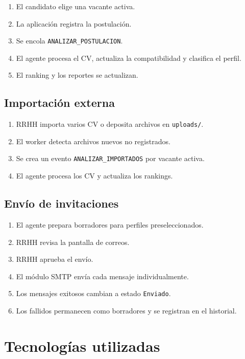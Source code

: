 \documentclass[12pt,a4paper]{article}
\begin{document}
\begin{enumerate}[leftmargin=*]
    \item El candidato elige una vacante activa.
    \item La aplicación registra la postulación.
    \item Se encola \texttt{ANALIZAR\_POSTULACION}.
    \item El agente procesa el CV, actualiza la compatibilidad y clasifica el perfil.
    \item El ranking y los reportes se actualizan.
\end{enumerate}

\subsection{Importación externa}

\begin{enumerate}[leftmargin=*]
    \item RRHH importa varios CV o deposita archivos en \texttt{uploads/}.
    \item El worker detecta archivos nuevos no registrados.
    \item Se crea un evento \texttt{ANALIZAR\_IMPORTADOS} por vacante activa.
    \item El agente procesa los CV y actualiza los rankings.
\end{enumerate}

\subsection{Envío de invitaciones}

\begin{enumerate}[leftmargin=*]
    \item El agente prepara borradores para perfiles preseleccionados.
    \item RRHH revisa la pantalla de correos.
    \item RRHH aprueba el envío.
    \item El módulo SMTP envía cada mensaje individualmente.
    \item Los mensajes exitosos cambian a estado \texttt{Enviado}.
    \item Los fallidos permanecen como borradores y se registran en el historial.
\end{enumerate}

\section{Tecnologías utilizadas}
\end{document}
